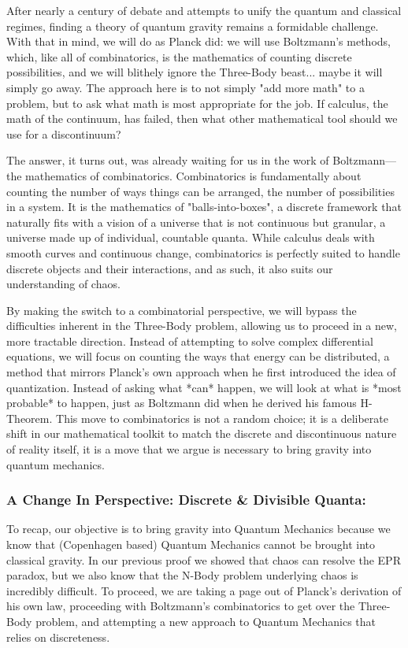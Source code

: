 \documentclass{report}
\begin{document}
After nearly a century of debate and attempts to unify the quantum and classical regimes, finding a theory of quantum gravity remains a formidable challenge. With that in mind, we will do as Planck did: we will use Boltzmann's methods, which, like all of combinatorics, is the mathematics of counting discrete possibilities, and we will blithely ignore the Three-Body beast... maybe it will simply go away. The approach here is to not simply "add more math" to a problem, but to ask what math is most appropriate for the job. If calculus, the math of the continuum, has failed, then what other mathematical tool should we use for a discontinuum?

The answer, it turns out, was already waiting for us in the work of Boltzmann—the mathematics of combinatorics. Combinatorics is fundamentally about counting the number of ways things can be arranged, the number of possibilities in a system. It is the mathematics of "balls-into-boxes", a discrete framework that naturally fits with a vision of a universe that is not continuous but granular, a universe made up of individual, countable quanta. While calculus deals with smooth curves and continuous change, combinatorics is perfectly suited to handle discrete objects and their interactions, and as such, it also suits our understanding of chaos.

By making the switch to a combinatorial perspective, we will bypass the difficulties inherent in the Three-Body problem, allowing us to proceed in a new, more tractable direction. Instead of attempting to solve complex differential equations, we will focus on counting the ways that energy can be distributed, a method that mirrors Planck's own approach when he first introduced the idea of quantization. Instead of asking what *can* happen, we will look at what is *most probable* to happen, just as Boltzmann did when he derived his famous H-Theorem. This move to combinatorics is not a random choice; it is a deliberate shift in our mathematical toolkit to match the discrete and discontinuous nature of reality itself, it is a move that we argue is necessary to bring gravity into quantum mechanics.

\subsubsection*{A Change In Perspective: Discrete \& Divisible Quanta:}
To recap, our objective is to bring gravity into Quantum Mechanics because we know that (Copenhagen based) Quantum Mechanics cannot be brought into classical gravity. In our previous proof we showed that chaos can resolve the EPR paradox, but we also know that the N-Body problem underlying chaos is incredibly difficult. To proceed, we are taking a page out of Planck's derivation of his own law, proceeding with Boltzmann's combinatorics to get over the Three-Body problem, and attempting a new approach to Quantum Mechanics that relies on discreteness.
\end{document}
